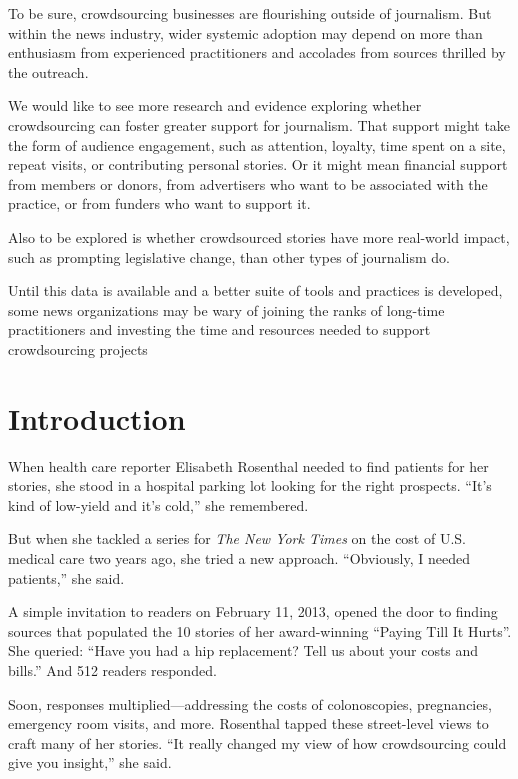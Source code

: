 \documentclass[notoc, symmetric, nobib, nols]{towcenter-guideto-book}
\begin{document}
To be sure, crowdsourcing businesses are flourishing outside of journalism. But within the news industry, wider systemic adoption may depend on more than enthusiasm from experienced practitioners and accolades from sources thrilled by the outreach.  

We would like to see more research and evidence exploring whether crowdsourcing can foster greater support for journalism. That support might take the form of audience engagement, such as attention, loyalty, time spent on a site, repeat visits, or contributing personal stories. Or it might mean financial support from members or donors, from advertisers who want to be associated with the practice, or from funders who want to support it. 

Also to be explored is whether crowdsourced stories have more real-world impact, such as prompting legislative change, than other types of journalism do. 

Until this data is available and a better suite of tools and practices is developed, some news organizations may be wary of joining the ranks of long-time practitioners and investing the time and resources needed to support crowdsourcing projects



\chapter{Introduction}

When health care reporter Elisabeth Rosenthal needed to find patients for her stories, she stood in a hospital parking lot looking for the right prospects. ``It's kind of low-yield and it's cold,'' she remembered.%

But when she tackled a series for \textit{The New York Times} on the cost of U.S. medical care two years ago, she tried a new approach. “Obviously, I needed patients,” she said.
       
A simple invitation to readers on February 11, 2013, opened the door to finding sources that populated the 10 stories of her award-winning ``Paying Till It Hurts''.\autocite{Paying} She queried: ``Have you had a hip replacement? Tell us about your costs and bills.'' And 512 readers responded.

Soon, responses multiplied---addressing the costs of colonoscopies, pregnancies, emergency room visits, and more. Rosenthal tapped these street-level views to craft many of her stories. ``It really changed my view of how crowdsourcing could give you insight,'' she said.%
\end{document}
